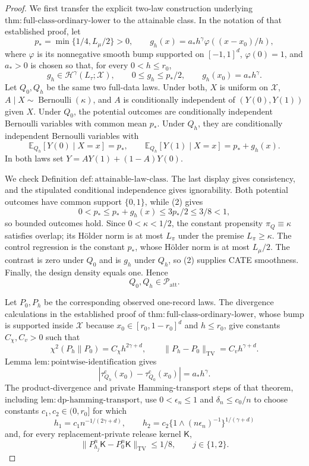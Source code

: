 \documentclass{article}
\begin{document}
\begin{proof}
We first transfer the explicit two-law construction underlying \(\mathrm{thm{:}full\text{-}class\text{-}ordinary\text{-}lower}\) to the attainable class.  In the notation of that established proof, let
\[
 p_* =\min\{1/4,L_\mu/2\}>0,
 \qquad
 g_h(x)=a_*h^\gamma\varphi((x-x_0)/h),
\tag{1}
\]
where \(\varphi\) is its nonnegative smooth bump supported on \([-1,1]^d\), \(\varphi(0)=1\), and \(a_*>0\) is chosen so that, for every \(0<h\le r_0\),
\[
 g_h\in\mathcal H^\gamma(L_\tau;\mathcal X),
 \qquad 0\le g_h\le p_*/2,
 \qquad g_h(x_0)=a_*h^\gamma.
\tag{2}
\]
Let \(Q_0,Q_h\) be the same two full-data laws.  Under both, \(X\) is uniform on \(\mathcal X\), \(A\mid X\sim\operatorname{Bernoulli}(\kappa)\), and \(A\) is conditionally independent of \((Y(0),Y(1))\) given \(X\).  Under \(Q_0\), the potential outcomes are conditionally independent Bernoulli variables with common mean \(p_*\).  Under \(Q_h\), they are conditionally independent Bernoulli variables with
\[
 \mathbb E_{Q_h}[Y(0)\mid X=x]=p_*,
 \qquad
 \mathbb E_{Q_h}[Y(1)\mid X=x]=p_*+g_h(x).
\tag{3}
\]
In both laws set \(Y=AY(1)+(1-A)Y(0)\).

We check Definition \(\mathrm{def{:}attainable\text{-}law\text{-}class}\).  The last display gives consistency, and the stipulated conditional independence gives ignorability.  Both potential outcomes have common support \(\{0,1\}\), while (2) gives
\[
 0<p_*\le p_*+g_h(x)\le3p_*/2\le3/8<1,
\]
so bounded outcomes hold.  Since \(0<\kappa<1/2\), the constant propensity \(\pi_Q\equiv\kappa\) satisfies overlap; its H\"older norm is at most \(L_\pi\) under the premise \(L_\pi\ge\kappa\).  The control regression is the constant \(p_*\), whose H\"older norm is at most \(L_\mu/2\).  The contrast is zero under \(Q_0\) and is \(g_h\) under \(Q_h\), so (2) supplies CATE smoothness.  Finally, the design density equals one.  Hence
\[
 Q_0,Q_h\in\mathcal P_{\mathrm{att}}.
\tag{4}
\]

Let \(P_0,P_h\) be the corresponding observed one-record laws.  The divergence calculations in the established proof of \(\mathrm{thm{:}full\text{-}class\text{-}ordinary\text{-}lower}\), whose bump is supported inside \(\mathcal X\) because \(x_0\in[r_0,1-r_0]^d\) and \(h\le r_0\), give constants \(C_\chi,C_v>0\) such that
\[
 \chi^2(P_h\|P_0)=C_\chi h^{2\gamma+d},
 \qquad
 \|P_h-P_0\|_{\mathrm{TV}}=C_vh^{\gamma+d}.
\tag{5}
\]
Lemma \(\mathrm{lem{:}pointwise\text{-}identification}\) gives
\[
 |\tau_{Q_h}^{\mathrm c}(x_0)-\tau_{Q_0}^{\mathrm c}(x_0)|
 =a_*h^\gamma.
\tag{6}
\]
The product-divergence and private Hamming-transport steps of that theorem, including \(\mathrm{lem{:}dp\text{-}hamming\text{-}transport}\), use \(0<\epsilon_n\le1\) and \(\delta_n\le c_0/n\) to choose constants \(c_1,c_2\in(0,r_0]\) for which
\[
 h_1=c_1n^{-1/(2\gamma+d)},
 \qquad
 h_2=c_2\{1\wedge(n\epsilon_n)^{-1}\}^{1/(\gamma+d)}
\tag{7}
\]
and, for every replacement-private release kernel \(\mathsf K\),
\[
 \|P_{h_j}^n\mathsf K-P_0^n\mathsf K\|_{\mathrm{TV}}\le1/8,
 \qquad j\in\{1,2\}.
\tag{8}
\]


\end{proof}
\end{document}

